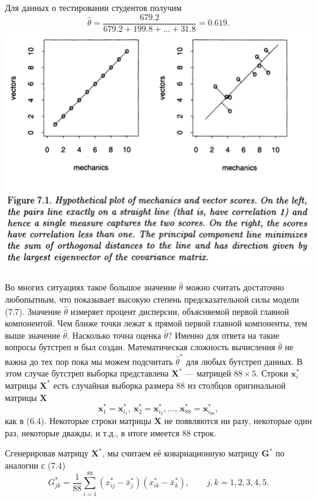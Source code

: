 Для данных о тестировании студентов получим
\begin{equation}
  \hat \theta = \frac{679.2}{679.2+199.8+\ldots+31.8} = 0.619.
\end{equation}
\includegraphics[width=0.85\linewidth]{6/f71.png}
\setcounter{figure}{1}

Во многих ситуациях такое большое значение $\hat \theta$ можно считать достаточно любопытным, что показывает высокую степень предсказательной силы модели (7.7).
Значение $\hat \theta$ измеряет процент дисперсии, объясняемой первой главной компонентой. Чем ближе точки лежат к прямой первой главной компоненты, тем выше значение $\hat \theta$.
Насколько точна оценка $\hat \theta$? Именно для ответа на такие вопросы бутстреп и был создан. Математическая сложность вычисления $\hat \theta$ не важна до тех пор пока мы можем подсчитать $\hat \theta^*$ для любых бутстреп данных. В этом случае бутстреп выборка представлена $\mathbf X^*$ --- матрицей $88\times 5$. Строки $\mathbf x_i^*$ матрицы $\mathbf X^*$ есть случайная выборка размера 88 из столбцов оригинальной матрицы $\mathbf X$
\begin{equation}
	\mathbf x_1^* = \mathbf x_{i_1}^*,\,\mathbf x_2^* = \mathbf x_{i_2}^*, \ldots,\, \mathbf x_{88}^* = \mathbf x_{i_{88}}^*, 
\end{equation}
как в (6.4). Некоторые строки матрицы $\mathbf X$ не появляются ни разу, некоторые один раз, некоторые дважды, и т.д., в итоге имеется 88 строк.

Сгенерировав матрицу $\mathbf X^*$, мы считаем её ковариационную матрицу $\mathbf G^*$ по аналогии с (7.4)
\begin{equation}
G_{jk}^* = \frac{1}{88}\sum_{i = 1}^{88} (x_{ij}^* - \bar x_j^*) (x_{ik}^* - \bar x_k^*), \qquad j,k = 1,2,3,4,5.
\end{equation}

